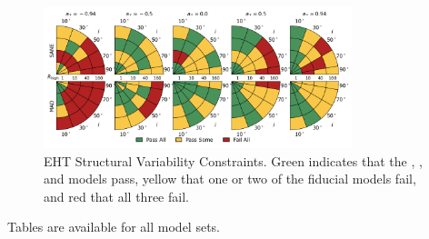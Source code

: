 \begin{figure}
  \centering
  \includegraphics[width=0.8\textwidth]{./figures/4Glam_Constraints.png}
  \caption{EHT Structural Variability Constraints.  Green indicates that the \kharma, \bhac, and \hamr models pass, yellow that one or two of the fiducial models fail, and red that all three fail.}
  \label{fig:ehtvar_pizza}
\end{figure}

Tables are available for all model sets.

\clearpage


%
%
%
%
%
%
%
%
%
%
%
%

\clearpage
